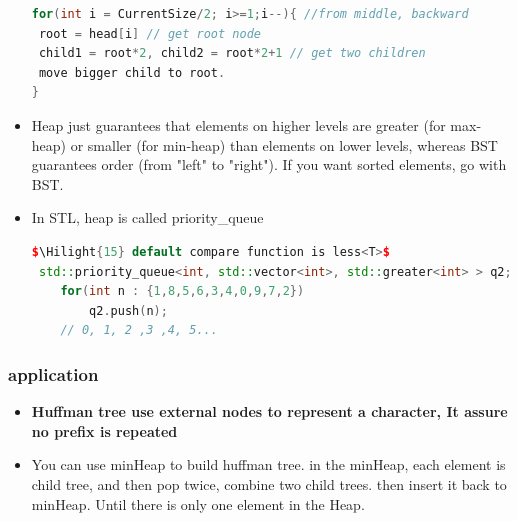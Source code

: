 \documentclass[a4paper,12pt,twoside]{book}
\newcommand{\Hilight}[1]{\makebox[0pt][l]{\color{yellow}\rule[-3pt]{#1em}{11pt}}}
\begin{document}
\begin{itemize}
\begin{lstlisting}[frame=single, language=c++]
for(int i = CurrentSize/2; i>=1;i--){ //from middle, backward
 root = head[i] // get root node
 child1 = root*2, child2 = root*2+1 // get two children
 move bigger child to root.
}
\end{lstlisting}

\item Heap just guarantees that elements on higher levels are greater (for max-heap) or smaller (for min-heap) than elements on lower levels, whereas BST guarantees order (from "left" to "right"). If you want sorted elements, go with BST.

\item In STL, heap is called priority\_queue

\begin{lstlisting}[frame=single, language=c++, mathescape=true]
$\Hilight{15} default compare function is less<T>$
 std::priority_queue<int, std::vector<int>, std::greater<int> > q2;
    for(int n : {1,8,5,6,3,4,0,9,7,2})
        q2.push(n);
    // 0, 1, 2 ,3 ,4, 5...
\end{lstlisting}

\end{itemize}


\subsubsection{application}
\begin{itemize}
\item \textbf{Huffman tree use external nodes to represent a character, It assure no prefix is repeated }
\item You can use minHeap to build huffman tree. in the minHeap, each element is child tree, and then pop twice, combine two child trees. then insert it back to minHeap. Until there is only one element in the Heap. 
\end{itemize}
\end{document}
